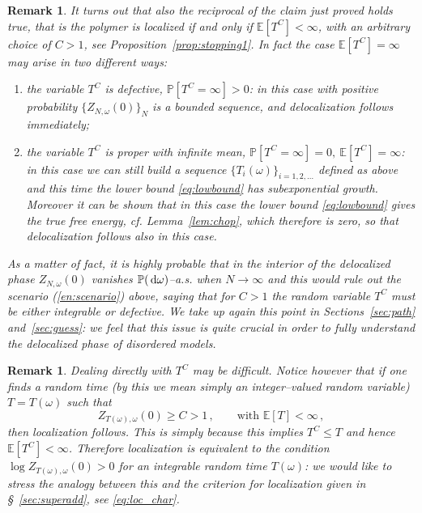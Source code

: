 \documentclass[reqno,11pt]{amsart}
\numberwithin{equation}{section}
\newtheorem{rem}[theorem]{Remark}
\newcommand{\dd}{\,\text{\rm d}}             %
\newcommand{\bbE}{{\ensuremath{\mathbb E}} }
\newcommand{\bbP}{{\ensuremath{\mathbb P}} }
\newcommand{\go}{\omega}
\begin{document}
\begin{rem}
\label{rem:reciprocal}
\rm
It turns out that also the reciprocal of the claim just proved holds true, that is \textsl{the polymer is localized if and only if $\bbE[T^C]<\infty$}, with an arbitrary choice of $C>1$, see Proposition~\ref{prop:stopping1}. In fact the case $\bbE[T^C]=\infty$ may arise in two different ways:
\begin{enumerate}
\item the variable $T^C$ is defective, $\bbP[T^C=\infty]>0$: in this case with positive probability $\{Z_{N,\go}(0)\}_N$ is a bounded sequence, and delocalization follows immediately;
\item\label{en:scenario} the variable $T^C$ is proper with infinite mean, $\bbP[T^C=\infty]=0,\ \bbE[T^C]=\infty$: in this case we can still build a sequence $\{T_i(\go)\}_{i=1,2,\ldots}$ defined as above and this time the lower bound \eqref{eq:lowbound} has \textsl{subexponential} growth. Moreover it can be shown that in this case the lower bound \eqref{eq:lowbound} gives the true free energy, cf. Lemma~\ref{lem:chop}, which therefore is zero, so that delocalization follows also in this case.
\end{enumerate}
As a matter of fact, it is highly probable that in the interior of the delocalized phase
$Z_{N,\go}(0)$ vanishes $\bbP (\dd \go)$--a.s.
when $N \to \infty$ and this would rule out the scenario (\ref{en:scenario}) above, saying that for $C>1$ the random variable $T^C$ must be either integrable or defective. We take up again this point in Sections~\ref{sec:path} and~\ref{sec:guess}: we feel that this issue
is quite crucial in order to fully understand the delocalized phase
of disordered models.
\end{rem}


\begin{rem}
\label{rem:analogy}
\rm
Dealing directly with $T^C$ may be difficult.
Notice however that if one finds
 a random time (by this we mean simply an integer--valued random variable)
 $T=T(\go)$ such that
 \begin{equation} \label{eq:but}
Z_{T(\go), \go}(0)\ge C>1\,, \qquad \text{with \ } \bbE[T]<\infty\,,
\end{equation}
then localization follows. This is simply because
this implies $T^C \le T$ and hence $\bbE[T^C]<\infty$. Therefore localization is equivalent to the condition $\log Z_{T(\go), \go}(0)>0$ for an \textsl{integrable} random time $T(\go)$: we would like to stress the analogy between this and the criterion for localization given in \S~\ref{sec:superadd}, see \eqref{eq:loc_char}.
\end{rem}
\end{document}
